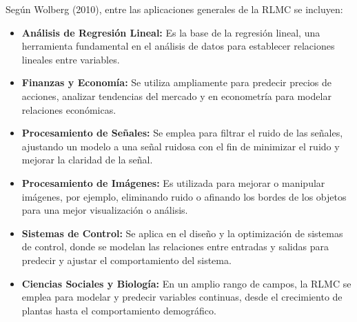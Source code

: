 \documentclass[12pt]{article}
\begin{document}
        \vspace{0.5em}
        \noindent
        Según Wolberg (2010), entre las aplicaciones generales de la RLMC se incluyen:
        \begin{itemize}
                \item \textbf{Análisis de Regresión Lineal:} Es la base de la regresión lineal, una herramienta fundamental en el análisis de datos para establecer relaciones lineales entre variables.
                \item \textbf{Finanzas y Economía:} Se utiliza ampliamente para predecir precios de acciones, analizar tendencias del mercado y en econometría para modelar relaciones económicas.
                \item \textbf{Procesamiento de Señales:} Se emplea para filtrar el ruido de las señales, ajustando un modelo a una señal ruidosa con el fin de minimizar el ruido y mejorar la claridad de la señal.
                \item \textbf{Procesamiento de Imágenes:} Es utilizada para mejorar o manipular imágenes, por ejemplo, eliminando ruido o afinando los bordes de los objetos para una mejor visualización o análisis.
                \item \textbf{Sistemas de Control:} Se aplica en el diseño y la optimización de sistemas de control, donde se modelan las relaciones entre entradas y salidas para predecir y ajustar el comportamiento del sistema.
                \item \textbf{Ciencias Sociales y Biología:} En un amplio rango de campos, la RLMC se emplea para modelar y predecir variables continuas, desde el crecimiento de plantas hasta el comportamiento demográfico.
        \end{itemize}
        
\end{document}
